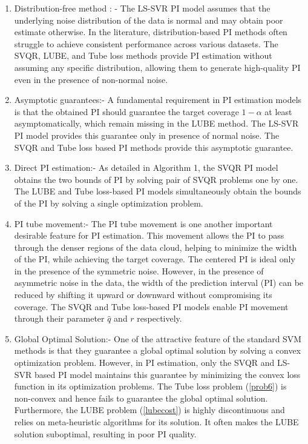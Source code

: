 \documentclass[10pt]{article} %
\begin{document}
\begin{enumerate}
    \item [(a)] Distribution-free method : - The LS-SVR PI model assumes that the underlying noise distribution of the data is normal and may obtain poor estimate otherwise. In the literature, distribution-based PI methods often struggle to achieve consistent performance across various datasets. The SVQR, LUBE, and Tube loss methods provide PI estimation without assuming any specific distribution, allowing them to generate high-quality PI even in the presence of non-normal noise.
     \item[(b)] Asymptotic guarantees:-  A fundamental requirement in PI estimation models is that the obtained PI should guarantee the target coverage $1-\alpha$ at least asymptomatically, which remain missing in the LUBE method. The LS-SVR PI model provides this guarantee only in presence of normal noise. The SVQR and Tube loss based PI methods provide this asymptotic guarantee.
     \item[(c)] Direct PI estimation:- As detailed in Algorithm 1, the SVQR PI model obtains the two bounds of PI by solving  pair of SVQR problems one by one. The LUBE and Tube loss-based PI models simultaneously obtain the bounds of the PI by solving a single optimization problem.
     \item[(d)] PI tube movement:- The PI tube movement is one another important desirable feature for PI estimation. This movement allows the PI to pass through the denser regions of the data cloud, helping to minimize the width of the PI, while achieving the target coverage. The centered PI is ideal only in the presence of the symmetric noise. However, in the presence of asymmetric noise in the data, the width of the prediction interval (PI) can be reduced by shifting it upward or downward without compromising its coverage.
     The SVQR and Tube loss-based PI models enable PI movement through their parameter $\hat{q}$ and $r$ respectively.

     \item [(e)] Global Optimal Solution:- One of the attractive feature of the standard SVM methods is that they guarantee a global optimal solution by solving a convex optimization problem. However, in PI estimation, only the SVQR and LS-SVR based PI model maintains this guarantee by minimizing the convex loss function in its optimization problems. The Tube loss problem (\ref{prob6}) is non-convex and hence fails to guarantee the global optimal solution. Furthermore, the LUBE problem (\ref{lubecost}) is highly discontinuous and relies on meta-heuristic algorithms for its solution. It  often makes the LUBE solution suboptimal, resulting in poor PI quality.


\end{enumerate}
\end{document}
